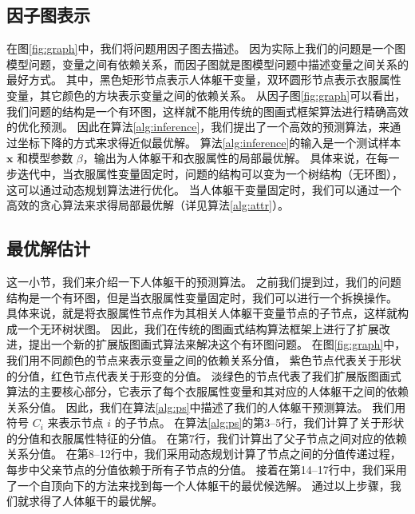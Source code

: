 \subsection{因子图表示}
在图\ref{fig:graph}中，我们将问题用因子图去描述。
因为实际上我们的问题是一个图模型问题，变量之间有依赖关系，而因子图就是图模型问题中描述变量之间关系的最好方式。
其中，黑色矩形节点表示人体躯干变量，双环圆形节点表示衣服属性变量，其它颜色的方块表示变量之间的依赖关系。
从因子图\ref{fig:graph}可以看出，我们问题的结构是一个有环图，这样就不能用传统的图画式框架算法进行精确高效的优化预测。
因此在算法\ref{alg:inference}，我们提出了一个高效的预测算法，来通过坐标下降的方式来求得近似最优解。
算法\ref{alg:inference}的输入是一个测试样本 $\mathbf{x}$ 和模型参数 $\beta$，输出为人体躯干和衣服属性的局部最优解。
具体来说，在每一步迭代中，当衣服属性变量固定时，问题的结构可以变为一个树结构（无环图），这可以通过动态规划算法\cite{ps2}进行优化。
当人体躯干变量固定时，我们可以通过一个高效的贪心算法来求得局部最优解（详见算法\ref{alg:attr}）。

\subsection{最优解估计}
这一小节，我们来介绍一下人体躯干的预测算法。
之前我们提到过，我们的问题结构是一个有环图，但是当衣服属性变量固定时，我们可以进行一个拆换操作。
具体来说，就是将衣服属性节点作为其相关人体躯干变量节点的子节点，这样就构成一个无环树状图。
因此，我们在传统的图画式结构算法框架上进行了扩展改进，提出一个新的扩展版图画式算法来解决这个有环图问题。
在图\ref{fig:graph}中，我们用不同颜色的节点来表示变量之间的依赖关系分值，
紫色节点代表关于形状的分值，红色节点代表关于形变的分值。
淡绿色的节点代表了我们扩展版图画式算法的主要核心部分，它表示了每个衣服属性变量和其对应的人体躯干之间的依赖关系分值。
因此，我们在算法\ref{alg:ps}中描述了我们的人体躯干预测算法。
我们用符号 $C_i$ 来表示节点 $i$ 的子节点。
在算法\ref{alg:ps}的第3--5行，我们计算了关于形状的分值和衣服属性特征的分值。
在第7行，我们计算出了父子节点之间对应的依赖关系分值。
在第8--12行中，我们采用动态规划计算了节点之间的分值传递过程，每步中父亲节点的分值依赖于所有子节点的分值。
接着在第14--17行中，我们采用了一个自顶向下的方法来找到每一个人体躯干的最优候选解。
通过以上步骤，我们就求得了人体躯干的最优解。

